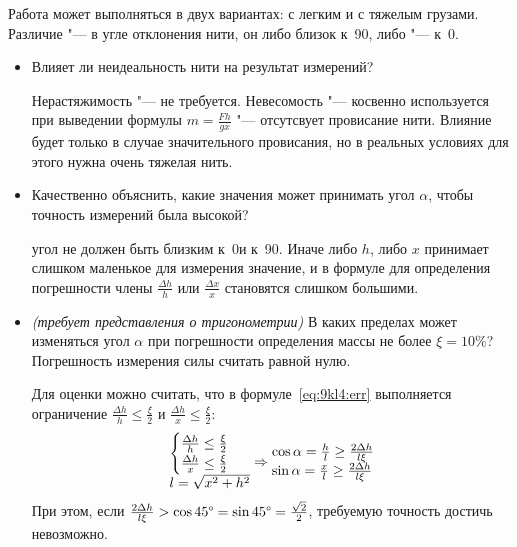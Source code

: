 \AdditionalNotes
Работа может выполняться в двух вариантах: с легким и с тяжелым грузами. Различие "--- в угле отклонения нити, он либо близок к~90\textdegree, либо "--- к~0\textdegree.
\AdditionalQuestions
\begin{itemize}
    \item Влияет ли неидеальность нити на результат измерений?\par
    \Answer Нерастяжимость "--- не требуется. Невесомость "--- косвенно используется при выведении формулы \(m=\frac{F h}{g x}\) "--- отсутсвует провисание нити. Влияние будет только в случае значительного провисания, но в реальных условиях для этого нужна очень тяжелая нить.
    \item Качественно объяснить, какие значения может принимать угол \(\alpha\), чтобы точность измерений была высокой?\par
    \Answer угол не должен быть близким к~0\textdegree и к~90\textdegree. Иначе либо \(h\), либо \(x\) принимает слишком маленькое для измерения значение, и в формуле для определения погрешности члены \(\frac{\Delta h}{h}\) или \(\frac{\Delta x}{x}\) становятся слишком большими.
   \item \textit{(требует представления о тригонометрии)} В каких пределах может изменяться угол \(\alpha\) при погрешности определения массы не более \(\xi=10\% \)? Погрешность измерения силы считать равной нулю.\par
   \Answer Для оценки можно считать, что в формуле~\eqref{eq:9kl4:err} выполняется ограничение \(\frac{\Delta h}{h} \leq \frac{\xi}{2}\) и \(\frac{\Delta h}{x} \leq \frac{\xi}{2}\):
   \begin{equation*}
    \begin{array}{@{}l@{}}
        \begin{cases}
            \frac{\Delta h}{h} \leq \frac{\xi}{2} \\
            \frac{\Delta h}{x} \leq \frac{\xi}{2}
        \end{cases}\\
        l=\sqrt{x^2+h^2}
    \end{array}
    \Rightarrow
    \begin{array}{@{}l@{}} 
    	\cos \alpha = \frac{h}{l} \geq \frac{2\Delta h}{l\xi} \\
    	\sin \alpha = \frac{x}{l} \geq \frac{2\Delta h}{l\xi}
    \end{array}
    \end{equation*}
    При этом, если \(\frac{2\Delta h}{l\xi}>\cos45\text{\textdegree}=\sin45\text{\textdegree}=\frac{\sqrt{2}}{2}\), требуемую точность достичь невозможно.
\end{itemize}

